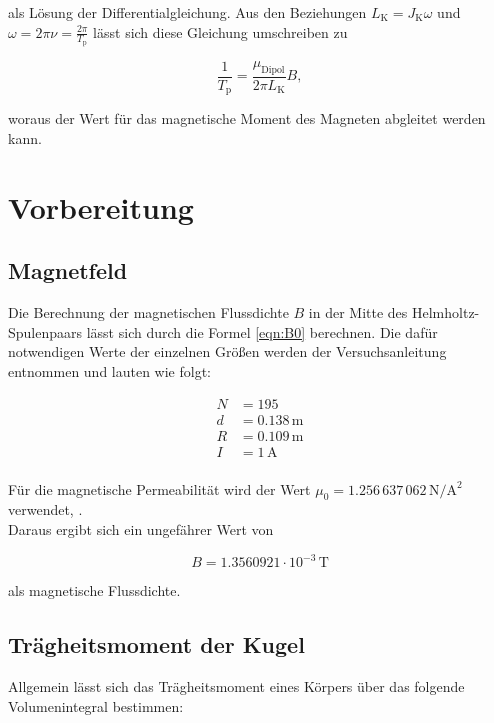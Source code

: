 \noindent als Lösung der Differentialgleichung. Aus den Beziehungen $L_\text{K} = J_\text{K}\omega$ und $\omega = 2\pi\nu
= \frac{2\pi}{T_\text{p}}$ lässt sich diese Gleichung umschreiben zu

\begin{equation}
\label{eqn:Praezession}
    \frac{1}{T_\text{p}} = \frac{\mu_\text{Dipol}}{2\pi{}L_\text{K}}B, 
\end{equation}

\noindent woraus der Wert für das magnetische Moment des Magneten abgleitet werden kann.

\section{Vorbereitung}

\subsection{Magnetfeld}
Die Berechnung der magnetischen Flussdichte $B$ in der Mitte des Helmholtz-Spulenpaars lässt sich durch die Formel 
\eqref{eqn:B0} berechnen. Die dafür notwendigen Werte der einzelnen Größen werden der Versuchsanleitung entnommen und
lauten wie folgt:

\begin{align*}
    N &= 195 \\
    d &= 0.138\,\unit{\meter} \\
    R &= 0.109\,\unit{\meter} \\
    I &= 1\,\unit{\ampere} \\
\end{align*}

\noindent Für die magnetische Permeabilität wird der Wert $\mu_0 = 1.256\,637\,062\,\unit{\newton\per\ampere\squared}$ 
verwendet, \cite{Magnetische_Feldkonstante}.\\

\noindent Daraus ergibt sich ein ungefährer Wert von 

\begin{equation*}
    B = 1.3560921 \cdot 10^{-3}\,\unit{\tesla}
\end{equation*}

\noindent als magnetische Flussdichte.

\subsection{Trägheitsmoment der Kugel}

Allgemein lässt sich das Trägheitsmoment eines Körpers über das folgende Volumenintegral bestimmen:

